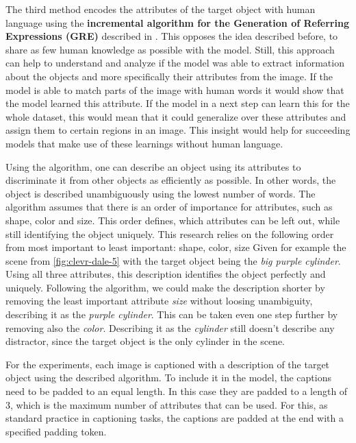 The third method encodes the attributes of the target object with human language using the \textbf{incremental algorithm for the Generation of Referring Expressions (GRE)} described in \citep{Dale1995}.
This opposes the idea described before, to share as few human knowledge as possible with the model.
Still, this approach can help to understand and analyze if the model was able to extract information about the objects and more specifically their attributes from the image.
If the model is able to match parts of the image with human words it would show that the model learned this attribute.
If the model in a next step can learn this for the whole dataset, this would mean that it could generalize over these attributes and assign them to certain regions in an image.
This insight would help for succeeding models that make use of these learnings without human language.

Using the algorithm, one can describe an object using its attributes to discriminate it from other objects as efficiently as possible.
In other words, the object is described unambiguously using the lowest number of words.
The algorithm assumes that there is an order of importance for attributes, such as shape, color and size.
This order defines, which attributes can be left out, while still identifying the object uniquely.
This research relies on the following order from most important to least important: shape, color, size
Given for example the scene from \ref{fig:clevr-dale-5} with the target object being the \emph{big purple cylinder}.
Using all three attributes, this description identifies the object perfectly and uniquely.
Following the algorithm, we could make the description shorter by removing the least important attribute \emph{size} without loosing unambiguity, describing it as the \emph{purple cylinder}.
This can be taken even one step further by removing also the \emph{color}.
Describing it as the \emph{cylinder} still doesn't describe any distractor, since the target object is the only cylinder in the scene.

For the experiments, each image is captioned with a description of the target object using the described algorithm.
To include it in the model, the captions need to be padded to an equal length.
In this case they are padded to a length of 3, which is the maximum number of attributes that can be used.
For this, as standard practice in captioning tasks, the captions are padded at the end with a specified padding token.

